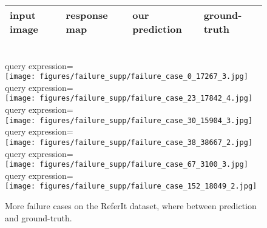 \documentclass[runningheads]{llncs}
\begin{document}
\begin{figure}[t]
\centering
\begin{tabularx}{0.95\linewidth}{YYYY}
input image & response map & our prediction & ground-truth \\ \hline
\end{tabularx} \\
\small{query expression=} \\
\texttt{[image: figures/failure\_supp/failure\_case\_0\_17267\_3.jpg]} \\
\small{query expression=} \\
\texttt{[image: figures/failure\_supp/failure\_case\_23\_17842\_4.jpg]} \\
\small{query expression=} \\
\texttt{[image: figures/failure\_supp/failure\_case\_30\_15904\_3.jpg]} \\
\small{query expression=} \\
\texttt{[image: figures/failure\_supp/failure\_case\_38\_38667\_2.jpg]} \\
\small{query expression=} \\
\texttt{[image: figures/failure\_supp/failure\_case\_67\_3100\_3.jpg]} \\
\small{query expression=} \\
\texttt{[image: figures/failure\_supp/failure\_case\_152\_18049\_2.jpg]} \\
\caption{More failure cases on the ReferIt dataset, where  between prediction and ground-truth.}
\label{fig:sample_failure_supp}
\end{figure}
\end{document}
